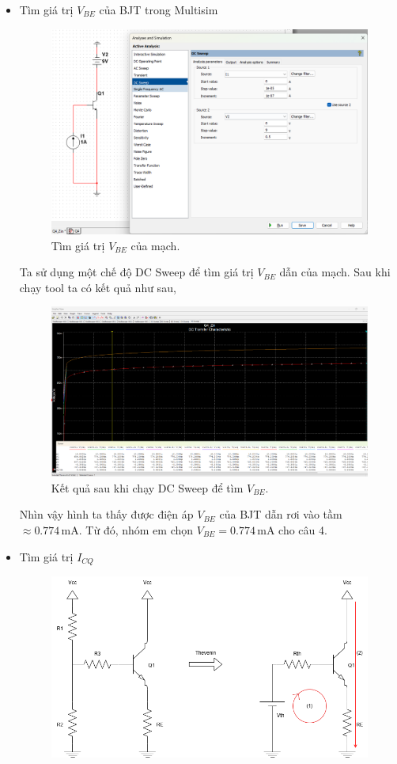 \begin{itemize}[label=-]
	\item Tìm giá trị $V_{BE}$ của BJT trong Multisim
	
	\begin{figure}[H]
		\centering
		\includegraphics[width=.8\linewidth]{./my-chapters/my-images/Question4/a_doVBE.png}
		\caption{Tìm giá trị $V_{BE}$ của mạch.}
	\end{figure}
	
	Ta sử dụng một chế độ DC Sweep để tìm giá trị $V_{BE}$ dẫn của mạch. Sau khi chạy tool ta có kết quả như sau,
	
	\begin{figure}[H]
		\centering
		\includegraphics[width=.8\linewidth]{./my-chapters/my-images/Question4/a_timVBE.png}
		\caption{Kết quả sau khi chạy DC Sweep để tìm $V_{BE}$.}
	\end{figure}
	
	Nhìn vậy hình ta thấy được điện áp $V_{BE}$ của BJT dẫn rơi vào tầm $ \approx 0.774\,\text{mA}$. Từ đó, nhóm em chọn $V_{BE} = 0.774\,\text{mA}$ cho câu 4.
	
	\item Tìm giá trị $I_{CQ}$
	
	\begin{figure}[H]
		\centering
		\includegraphics[width=.7\linewidth]{./my-chapters/my-diagrams/Question4/Debai.png}
	\end{figure}
	

\end{itemize}
